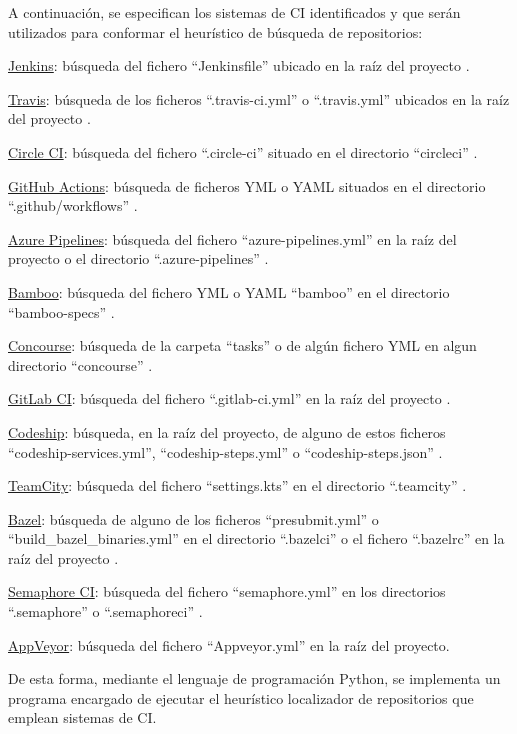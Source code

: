 A continuación, se especifican los sistemas de CI identificados y que serán utilizados para conformar el heurístico de búsqueda de repositorios:
\begin{compactitem}
    \item \underline{Jenkins}: búsqueda del fichero ``Jenkinsfile'' ubicado en la raíz del proyecto \cite{jenkins}.
    \item \underline{Travis}: búsqueda de los ficheros ``.travis-ci.yml'' o ``.travis.yml'' ubicados en la raíz del proyecto \cite{travisCI}.
    \item \underline{Circle CI}: búsqueda del fichero ``.circle-ci'' situado en el directorio ``circleci'' \cite{circleCI}.
    \item \underline{GitHub Actions}: búsqueda de ficheros YML o YAML situados en el directorio ``.github/workflows'' \cite{githubActions}.
    \item \underline{Azure Pipelines}: búsqueda del fichero ``azure-pipelines.yml'' en la raíz del proyecto o el directorio ``.azure-pipelines'' \cite{azurePipelines}.
    \item \underline{Bamboo}: búsqueda del fichero YML o YAML ``bamboo'' en el directorio ``bamboo-specs'' \cite{bamboo}.
    \item \underline{Concourse}: búsqueda de la carpeta ``tasks'' o de algún fichero YML en algun directorio ``concourse'' \cite{concourse}.
    \item \underline{GitLab CI}: búsqueda del fichero ``.gitlab-ci.yml'' en la raíz del proyecto \cite{gitlabCI}.
    \item \underline{Codeship}: búsqueda, en la raíz del proyecto, de alguno de estos ficheros ``codeship-services.yml'', ``codeship-steps.yml'' o ``codeship-steps.json'' \cite{codeship}.
    \item \underline{TeamCity}: búsqueda del fichero ``settings.kts'' en el directorio ``.teamcity'' \cite{teamcity}.
    \item \underline{Bazel}: búsqueda de alguno de los ficheros ``presubmit.yml'' o ``build\_bazel\_binaries.yml'' en el directorio ``.bazelci'' o el fichero ``.bazelrc'' en la raíz del proyecto \cite{bazel}.
    \item \underline{Semaphore CI}: búsqueda del fichero ``semaphore.yml'' en los directorios ``.semaphore'' o ``.semaphoreci'' \cite{semaphoreCI}.
    \item \underline{AppVeyor}: búsqueda del fichero ``Appveyor.yml'' en la raíz del proyecto.
\end{compactitem}
	
De esta forma, mediante el lenguaje de programación Python, se implementa un programa encargado de ejecutar el heurístico localizador de repositorios que emplean sistemas de CI.
